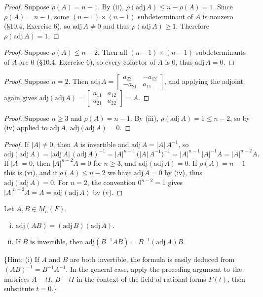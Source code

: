 \begin{proof}
    Suppose $\rho(A) = n - 1$.
    By (ii), $\rho(\text{adj}\, A) \le n - \rho(A) = 1$.
    Since $\rho(A) = n - 1$, some $(n-1) \times (n-1)$ subdeterminant of $A$ is nonzero
    (\S10.4, Exercise 6), so $\text{adj}\, A \ne 0$ and thus $\rho(\text{adj}\, A) \ge 1$.
    Therefore $\rho(\text{adj}\, A) = 1$.
\end{proof}

\begin{proof}
    Suppose $\rho(A) \le n - 2$.
    Then all $(n-1) \times (n-1)$ subdeterminants of $A$ are $0$ (\S10.4, Exercise 6),
    so every cofactor of $A$ is $0$, thus $\text{adj}\, A = 0$.
\end{proof}

\begin{proof}
    Suppose $n = 2$.
    Then $\text{adj}\, A = \begin{bmatrix} a_{22} & -a_{12} \\ -a_{21} & a_{11} \end{bmatrix}$,
    and applying the adjoint again gives
    $\text{adj}(\text{adj}\, A) = \begin{bmatrix} a_{11} & a_{12} \\ a_{21} & a_{22} \end{bmatrix} = A$.
\end{proof}

\begin{proof}
    Suppose $n \ge 3$ and $\rho(A) = n - 1$.
    By (iii), $\rho(\text{adj}\, A) = 1 \le n - 2$, so by (iv) applied to $\text{adj}\, A$,
    $\text{adj}(\text{adj}\, A) = 0$.
\end{proof}

\begin{proof}
    If $|A| \ne 0$, then $A$ is invertible and $\text{adj}\, A = |A|\, A^{-1}$, so
    \[
    \text{adj}(\text{adj}\, A) = |\text{adj}\, A|\,(\text{adj}\, A)^{-1}
    = |A|^{n-1}\,\big(|A|\,A^{-1}\big)^{-1}
    = |A|^{n-1}\,|A|^{-1} A = |A|^{n-2} A.
    \]
    If $|A| = 0$, then $|A|^{n-2} A = 0$ for $n \ge 3$, and $\text{adj}(\text{adj}\, A) = 0$.
    If $\rho(A) = n-1$ this is (vi), and if $\rho(A) \le n-2$ we have $\text{adj}\, A = 0$ by (iv),
    thus $\text{adj}(\text{adj}\, A) = 0$. For $n = 2$, the convention $0^{n-2} = 1$ gives
    $|A|^{n-2} A = A = \text{adj}(\text{adj}\, A)$ by (v).
\end{proof}


\begin{tcolorbox}[title=Problem 7, breakable]
Let $A, B \in M_n(F)$.
\begin{enumerate}[(i)]
    \item $\text{adj}(AB) = (\text{adj}\, B)(\text{adj}\, A)$.
    \item If $B$ is invertible, then $\text{adj}(B^{-1}AB) = B^{-1}(\text{adj}\, A)B$.
\end{enumerate}

\{Hint: (i) If $A$ and $B$ are both invertible, the formula is easily deduced from $(AB)^{-1} = B^{-1}A^{-1}$. In the general case, apply the preceding argument to the matrices $A - tI$, $B - tI$ in the context of the field of rational forms $F(t)$, then substitute $t = 0$.\}
\end{tcolorbox}


